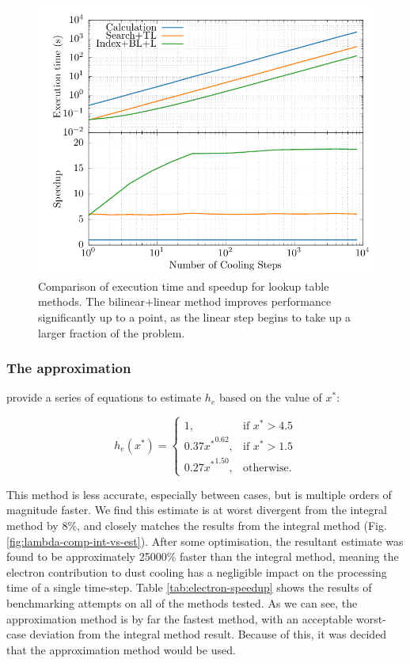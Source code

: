 \begin{figure}[ht]
  \centering
  \includegraphics{assets/lambda-dust-speedup/lambda-dust-speedup.pdf}
  \caption[Dust lookup table methods comparison]{Comparison of execution time and speedup for lookup table methods. The bilinear+linear method improves performance significantly up to a point, as the linear step begins to take up a larger fraction of the problem.}
  \label{fig:dust-opt-speedup}
\end{figure}

\subsubsection{The \textcite{dwek_infrared_1981} approximation}

\textcite{dwek_infrared_1981} provide a series of equations to estimate $h_{e}$ based on the value of $x^*$:

\begin{equation}
  h_e(x^*) = 
  \begin{cases}
    1                , & \text{if } x^* > 4.5 \\
    0.37{x^*}^{0.62} , & \text{if } x^* > 1.5 \\
    0.27{x^*}^{1.50} , & \text{otherwise.}
  \end{cases}
  \label{eq:electrontransparencyestimate}
\end{equation}

\noindent
This method is less accurate, especially between cases, but is multiple orders of magnitude faster.
We find this estimate is at worst divergent from the integral method by $8\%$, and closely matches the results from the integral method (Fig. \ref{fig:lambda-comp-int-vs-est}).
After some optimisation, the resultant estimate was found to be approximately \num{25000}\% faster than the integral method, meaning the electron contribution to dust cooling has a negligible impact on the processing time of a single time-step.
Table \ref{tab:electron-speedup} shows the results of benchmarking attempts on all of the methods tested.
As we can see, the approximation method is by far the fastest method, with an acceptable worst-case deviation from the integral method result.
Because of this, it was decided that the approximation method would be used.

